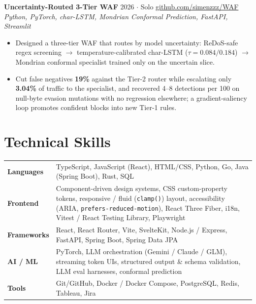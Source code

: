 \documentclass[11pt, a4paper]{article}
\begin{document}
\textbf{Uncertainty-Routed 3-Tier WAF} \hfill 2026 $\cdot$ Solo \quad
  \href{https://github.com/simenzzz/WAF}{github.com/simenzzz/WAF} \\
\textit{Python, PyTorch, char-LSTM, Mondrian Conformal Prediction, FastAPI, Streamlit}
\begin{itemize}
  \item Designed a three-tier WAF that routes by model uncertainty: ReDoS-safe regex
        screening $\to$ temperature-calibrated char-LSTM ($\tau=0.084/0.184$)
        $\to$ Mondrian conformal specialist trained only on the uncertain slice.
  \item Cut false negatives \textbf{19\%} against the Tier-2 router while escalating
        only \textbf{3.04\%} of traffic to the specialist, and recovered 4--8 detections
        per 100 on null-byte evasion mutations with no regression elsewhere;
        a gradient-saliency loop promotes confident blocks into new Tier-1 rules.
\end{itemize}

\section{Technical Skills}

\begin{tabularx}{\linewidth}{@{} l X}
  \textbf{Languages}   & TypeScript, JavaScript (React), HTML/CSS, Python, Go,
                          Java (Spring Boot), Rust, SQL \\
  \textbf{Frontend}    & Component-driven design systems, CSS custom-property tokens,
                          responsive / fluid (\texttt{clamp()}) layout, accessibility
                          (ARIA, \texttt{prefers-reduced-motion}), React Three Fiber,
                          i18n, Vitest / React Testing Library, Playwright \\
  \textbf{Frameworks}  & React, React Router, Vite, SvelteKit, Node.js / Express, FastAPI,
                          Spring Boot, Spring Data JPA \\
  \textbf{AI / ML}     & PyTorch, LLM orchestration (Gemini / Claude / GLM), streaming
                          token UIs, structured output \& schema validation,
                          LLM eval harnesses, conformal prediction \\
  \textbf{Tools}       & Git/GitHub, Docker / Docker Compose, PostgreSQL, Redis, Tableau, Jira \\
\end{tabularx}
\end{document}
